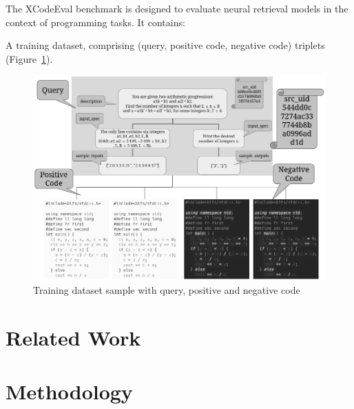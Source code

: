 \documentclass[12pt]{article}
\begin{document}
The XCodeEval benchmark is designed to evaluate neural retrieval models in the context of programming tasks. It contains:

    A training dataset, comprising (query, positive code, negative code) triplets (Figure~\ref{fig:training}).


\begin{figure}[ht]
\centering
\includegraphics[width=1.0\textwidth]{images/task-gray.png}
\caption{Training dataset sample with query, positive and negative code}
\label{fig:training}
\end{figure}


\section{Related Work}



\section{Methodology}





\end{document}
